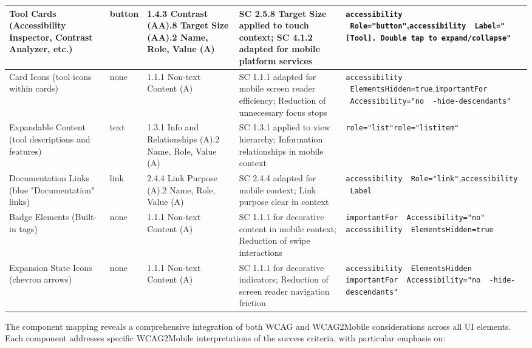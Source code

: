 \begin{longtable}[c]{|C{2.9cm}|C{2cm}|C{2.8cm}|C{3.2cm}|C{4.7cm}|}
\hline
Tool Cards (Accessibility Inspector, Contrast Analyzer, etc.) & button & 1.4.3 Contrast (AA).8 Target Size (AA).2 Name, Role, Value (A) & SC 2.5.8 Target Size applied to touch context; SC 4.1.2 adapted for mobile platform services & \texttt{accessibility \ Role="button"},\newline \texttt{accessibility \ Label="[Tool]. Double tap to expand/collapse"} \\
\hline
Card Icons (tool icons within cards) & none & 1.1.1 Non-text Content (A) & SC 1.1.1 adapted for mobile screen reader efficiency; Reduction of unnecessary focus stops & \texttt{accessibility \ ElementsHidden=true},\newline \texttt{importantFor \ Accessibility="no \ -hide-descendants"} \\
\hline
Expandable Content (tool descriptions and features) & text & 1.3.1 Info and Relationships (A).2 Name, Role, Value (A) & SC 1.3.1 applied to view hierarchy; Information relationships in mobile context & \texttt{role="list"}\newline \texttt{role="listitem"} \\
\hline
Documentation Links (blue "Documentation" links) & link & 2.4.4 Link Purpose (A).2 Name, Role, Value (A) & SC 2.4.4 adapted for mobile context; Link purpose clear in context & \texttt{accessibility \ Role="link"},\newline \texttt{accessibility \ Label} \\
\hline
Badge Elements (Built-in tags) & none & 1.1.1 Non-text Content (A) & SC 1.1.1 for decorative content in mobile context; Reduction of swipe interactions & \texttt{importantFor \ Accessibility="no"} \newline \texttt{accessibility \ ElementsHidden=true} \\
\hline
Expansion State Icons (chevron arrows) & none & 1.1.1 Non-text Content (A) & SC 1.1.1 for decorative indicators; Reduction of screen reader navigation friction & \texttt{accessibility \ ElementsHidden} \newline \texttt{importantFor \ Accessibility="no \ -hide-descendants"} \\
\end{longtable}
\FloatBarrier

The component mapping reveals a comprehensive integration of both WCAG and WCAG2Mobile considerations across all UI elements. Each component addresses specific WCAG2Mobile interpretations of the success criteria, with particular emphasis on:

